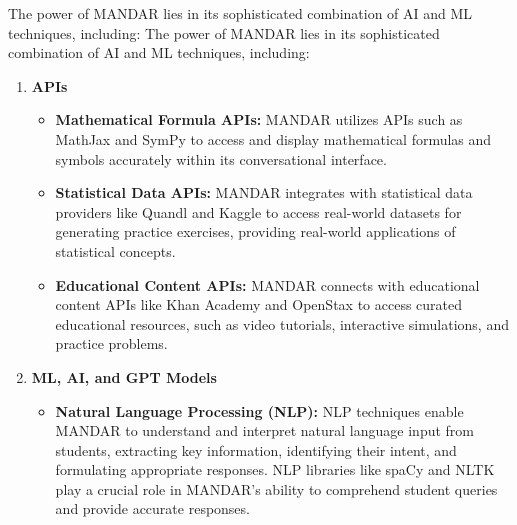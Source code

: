 \documentclass[20pt]{report}
\begin{document}
The power of MANDAR lies in its sophisticated combination of AI and ML techniques, including:
The power of MANDAR lies in its sophisticated combination of AI and ML techniques, including:
\begin{enumerate}
\item \textbf{APIs}

\begin{itemize}

\item \textbf{Mathematical Formula APIs:} MANDAR utilizes APIs such as MathJax and SymPy to access and display mathematical formulas and symbols accurately within its conversational interface.

\item \textbf{Statistical Data APIs:} MANDAR integrates with statistical data providers like Quandl and Kaggle to access real-world datasets for generating practice exercises, providing real-world applications of statistical concepts.

\item \textbf{Educational Content APIs:} MANDAR connects with educational content APIs like Khan Academy and OpenStax to access curated educational resources, such as video tutorials, interactive simulations, and practice problems.

\end{itemize}

\item \textbf{ML, AI, and GPT Models}

\begin{itemize}

\item \textbf{Natural Language Processing (NLP):} NLP techniques enable MANDAR to understand and interpret natural language input from students, extracting key information, identifying their intent, and formulating appropriate responses. NLP libraries like spaCy and NLTK play a crucial role in MANDAR's ability to comprehend student queries and provide accurate responses.


\end{itemize}
\end{enumerate}
\end{document}
